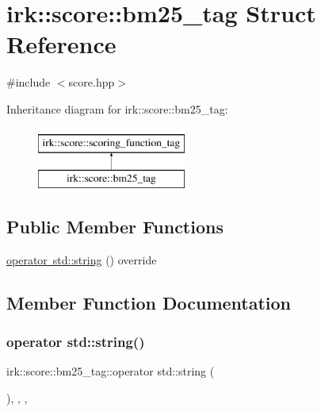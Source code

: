 \hypertarget{structirk_1_1score_1_1bm25__tag}{}\section{irk\+:\+:score\+:\+:bm25\+\_\+tag Struct Reference}
\label{structirk_1_1score_1_1bm25__tag}


{\ttfamily \#include $<$score.\+hpp$>$}

Inheritance diagram for irk\+:\+:score\+:\+:bm25\+\_\+tag\+:\begin{figure}[H]
\begin{center}
\leavevmode
\includegraphics[height=2.000000cm]{structirk_1_1score_1_1bm25__tag}
\end{center}
\end{figure}
\subsection*{Public Member Functions}
\begin{DoxyCompactItemize}
\item 
\mbox{\hyperlink{structirk_1_1score_1_1bm25__tag_a3575a5c838ad5a235198d525e665e0f1}{operator std\+::string}} () override
\end{DoxyCompactItemize}


\subsection{Member Function Documentation}
\mbox{\label{structirk_1_1score_1_1bm25__tag_a3575a5c838ad5a235198d525e665e0f1}} 
\subsubsection{\texorpdfstring{operator std\+::string()}{operator std::string()}}
{\footnotesize\ttfamily irk\+::score\+::bm25\+\_\+tag\+::operator std\+::string (\begin{DoxyParamCaption}{ }\end{DoxyParamCaption})\hspace{0.3cm}{\ttfamily [inline]}, {\ttfamily [explicit]}, {\ttfamily [override]}, {\ttfamily [virtual]}}



